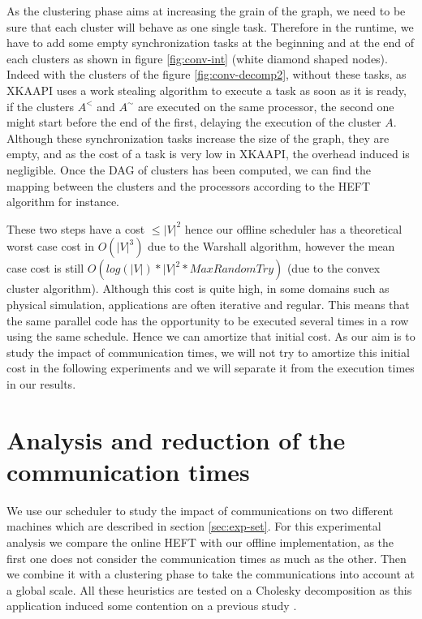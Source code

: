 \documentclass[10pt, conference, compsocconf,pdftex,dvipsnames]{IEEEtran}
\begin{document}
As the clustering phase aims at increasing the grain of the graph, we need to
be sure that each cluster will behave as one single task. Therefore in the
runtime, we have to add some empty synchronization tasks at the beginning and
at the end of each clusters as shown in figure \ref{fig:conv-int} (white
diamond shaped nodes). Indeed with the clusters of the figure
\ref{fig:conv-decomp2}, without these tasks,  as XKAAPI uses a work stealing
algorithm to execute a task as soon as it is ready, if the clusters $A^<$ and
$A^{\sim}$ are executed on the same processor, the second one might start
before the end of the first, delaying the execution of the cluster $A$.
Although these synchronization tasks increase the size of the graph, they are
empty, and as the cost of a task is very low in XKAAPI, the overhead induced
is negligible. Once the DAG of clusters has been computed, we can find the
mapping between the clusters and the processors according to the HEFT
algorithm for instance. 

These two steps have a cost $\leq |V|^2$ hence our offline scheduler has a
theoretical worst case cost in $O(|V|^3)$ due to the Warshall algorithm,
however the mean case cost is still $O(log(|V|)*|V|^2*MaxRandomTry)$ (due to
the convex cluster algorithm).  Although this cost is quite high, in some
domains such as physical simulation, applications are often
iterative and regular. This means that the same parallel code has the
opportunity to be executed several times in a row using the same schedule.
Hence we can amortize that initial cost. As our aim is to study the impact of
communication times, we will not try to amortize this initial cost in the
following experiments and we will separate it from the execution times in our
results.

\section{Analysis and reduction of the communication times}
\label{sec:exp}

We use our scheduler to study the impact of communications on two different
machines which are described in section \ref{sec:exp-set}. For this
experimental analysis we compare the online HEFT with our offline implementation,
as the first one does not consider the communication times as much as the
other. Then we combine it with a clustering phase to take the communications
into account at a global scale. All these heuristics are tested on a
Cholesky decomposition as this application induced some contention on a
previous study \cite{ferreiralima:hal-00735470}.
\end{document}
